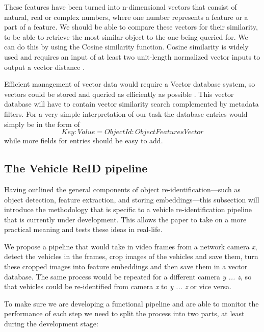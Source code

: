 \documentclass[conference]{IEEEtran} %
\begin{document}
		These features have been turned into n-dimensional vectors that consist of natural, real or complex numbers, where one number represents a feature or a part of a feature. We should be able to compare these vectors for their similarity, to be able to retrieve the most similar object to the one being queried for. We can do this by using the Cosine similarity function. Cosine similarity is widely used and requires an input of at least two unit-length normalized vector inputs to output a vector distance \cite{bayardo2007scaling}.
		
		Efficient management of vector data would require a Vector database system, so vectors could be stored and queried as efficiently as possible \cite{taipalus2024vector}. This vector database will have to contain vector similarity search complemented by metadata filters. For a very simple interpretation of our task the database entries would simply be in the form of $$ Key:Value = ObjectId:ObjectFeaturesVector $$ while more fields for entries should be easy to add.
		
	\subsection{The Vehicle ReID pipeline}
	
		Having outlined the general components of object re-identification—such as object detection, feature extraction, and storing embeddings—this subsection will introduce the methodology that is specific  to a vehicle re-identification pipeline that is currently under development. This allows the paper to take on a more practical meaning and tests these ideas in real-life.
		
		We propose a pipeline that would take in video frames from a network camera \textit{x}, detect the vehicles in the frames, crop images of the vehicles and save them, turn these cropped images into feature embeddings and then save them in a vector database. The same process would be repeated for a different camera \textit{y ... z}, so that vehicles could be re-identified from camera \textit{x} to \textit{y ... z} or vice versa.
		
		To make sure we are developing a functional pipeline and are able to monitor the performance of each step we need to split the process into two parts, at least during the development stage:
		
\end{document}
